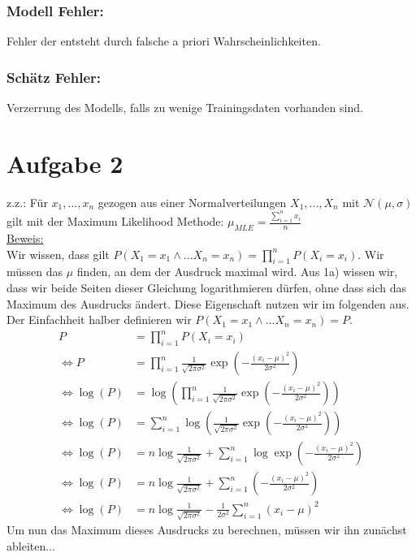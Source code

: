 \documentclass[a4paper]{scrartcl}
\begin{document}
\subsubsection*{Modell Fehler:}
Fehler der entsteht durch falsche a priori Wahrscheinlichkeiten.
\subsubsection*{Schätz Fehler:}
Verzerrung des Modells, falls zu wenige Trainingsdaten vorhanden sind.

\newpage
\section*{Aufgabe 2}
z.z.: Für $x_1,...,x_n$ gezogen aus einer Normalverteilungen $X_1,...,X_n$ mit $\mathcal{N}(\mu, \sigma)$ gilt mit der Maximum Likelihood Methode: $\mu_{MLE} = \frac{\sum_{i=1}^{n} x_i}{n}$\\
\underline{Beweis:}\\
Wir wissen, dass gilt $P(X_1 = x_1 \wedge ... X_n = x_n) = \prod_{i=1}^n P(X_i = x_i)$. Wir müssen das $\mu$ finden, an dem der Ausdruck maximal wird. Aus 1a) wissen wir, dass wir beide Seiten dieser Gleichung logarithmieren dürfen, ohne dass sich das Maximum des Ausdrucks ändert. Diese Eigenschaft nutzen wir im folgenden aus. Der Einfachheit halber definieren wir $P(X_1 = x_1 \wedge ... X_n = x_n) = P$.
\begin{align*}
	P &= \prod_{i=1}^n P(X_i = x_i)\\
	\Leftrightarrow P &= \prod_{i=1}^n \frac{1}{\sqrt{2\pi \sigma^2}} \exp{(- \frac{(x_i-\mu)^2}{2\sigma^2})}\\
	\Leftrightarrow \log(P) &= \log(\prod_{i=1}^n \frac{1}{\sqrt{2\pi \sigma^2}} \exp{(- \frac{(x_i-\mu)^2}{2\sigma^2})})\\
	\Leftrightarrow \log(P) &= \sum_{i=1}^{n}\log( \frac{1}{\sqrt{2\pi \sigma^2}} \exp{(- \frac{(x_i-\mu)^2}{2\sigma^2})})\\
	\Leftrightarrow \log(P) &= n \log\frac{1}{\sqrt{2\pi \sigma^2}} + \sum_{i=1}^{n} \log\exp{(- \frac{(x_i-\mu)^2}{2\sigma^2})}\\
	\Leftrightarrow \log(P) &= n \log\frac{1}{\sqrt{2\pi \sigma^2}} + \sum_{i=1}^{n} (- \frac{(x_i-\mu)^2}{2\sigma^2})\\
	\Leftrightarrow \log(P) &= n \log\frac{1}{\sqrt{2\pi \sigma^2}} - \frac{1}{2\sigma^2}\sum_{i=1}^{n} (x_i-\mu)^2
\end{align*}
Um nun das Maximum dieses Ausdrucks zu berechnen, müssen wir ihn zunächst ableiten...
\end{document}
